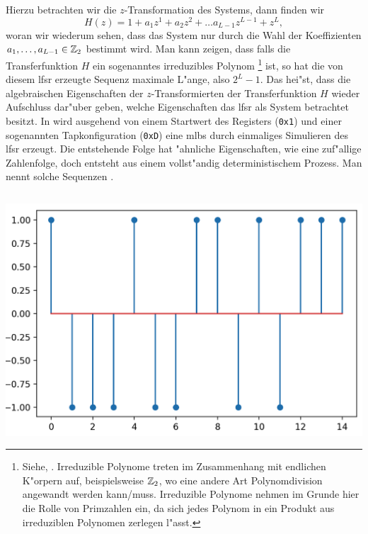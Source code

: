 Hierzu betrachten wir die $z$-Transformation des Systems, dann finden wir
\[
H(z) = 1 + a_1 z^{1} + a_2 z^2 + \ldots a_{L-1} z^{L-1} + z^L,
\]
woran wir wiederum sehen, dass das System nur durch die Wahl der Koeffizienten $a_1, \ldots, a_{L-1} \in \mathbb{Z}_2$ bestimmt wird.
Man kann zeigen, dass falls die Transferfunktion $H$ ein sogenanntes irreduzibles Polynom
\footnote{
    Siehe, . 
    Irreduzible Polynome treten im Zusammenhang mit endlichen K"orpern auf, beispielsweise $\mathbb{Z}_2$, wo eine andere Art Polynomdivision angewandt werden kann/muss. 
    Irreduzible Polynome nehmen im Grunde hier die Rolle von Primzahlen ein, da sich jedes Polynom in ein Produkt aus irreduziblen Polynomen zerlegen l"asst.
} ist, so hat die von diesem \gls{lfsr} erzeugte Sequenz maximale L"ange, also $2^L-1$.
Das hei"st, dass die algebraischen Eigenschaften der $z$-Transformierten der Transferfunktion $H$ wieder Aufschluss dar"uber geben, welche Eigenschaften das \gls{lfsr} als System betrachtet besitzt.
In  wird ausgehend von einem Startwert des Registers (\texttt{0x1}) und einer sogenannten Tapkonfiguration (\texttt{0xD}) eine \gls{mlbs} durch einmaliges Simulieren des \gls{lfsr} erzeugt.
Die entstehende Folge hat "ahnliche Eigenschaften, wie eine  zuf"allige Zahlenfolge, doch entsteht aus einem vollst"andig deterministischem Prozess.
Man nennt solche Sequenzen .
%
\begin{listing}[ht]
    \noindent
    \begin{minipage}{0.51\textwidth}
        \strut\vspace*{-\baselineskip}\newline
        \inputminted[firstline=5, lastline=32]{python3}{code/mlbs.py}
    \end{minipage}%
    \begin{minipage}{0.48\textwidth}
        \strut\vspace*{-\baselineskip}\newline
        \includegraphics[width=\textwidth]{code/mlbs.png}
    \end{minipage}
    \label{py:mlbs}
\end{listing}
%
\FloatBarrier
%
